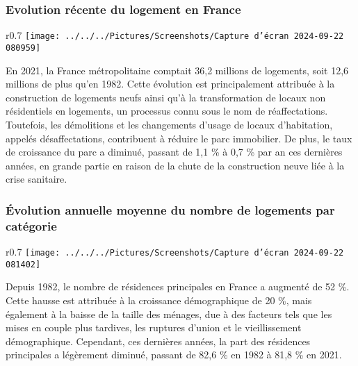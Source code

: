 \documentclass[a4paper, 12pt]{report}
\begin{document}
\subsubsection{Evolution récente du logement en France}

\begin{wrapfigure}{r}{0.7\textwidth}
	\centering
	\texttt{[image: ../../../Pictures/Screenshots/Capture d'écran 2024-09-22 080959]}
\end{wrapfigure}

En 2021, la France métropolitaine comptait 36,2 millions de logements, soit 12,6 millions de plus qu’en 1982. Cette évolution est principalement attribuée à la construction de logements neufs ainsi qu’à la transformation de locaux non résidentiels en logements, un processus connu sous le nom de réaffectations. Toutefois, les démolitions et les changements d’usage de locaux d’habitation, appelés désaffectations, contribuent à réduire le parc immobilier. De plus, le taux de croissance du parc a diminué, passant de 1,1 \% à 0,7 \% par an ces dernières années, en grande partie en raison de la chute de la construction neuve liée à la crise sanitaire.

\subsubsection{Évolution annuelle moyenne du nombre de logements par catégorie}

\begin{wrapfigure}{r}{0.7\textwidth}
	\centering
\texttt{[image: ../../../Pictures/Screenshots/Capture d'écran 2024-09-22 081402]}
\end{wrapfigure}

Depuis 1982, le nombre de résidences principales en France a augmenté de 52 \%. Cette hausse est attribuée à la croissance démographique de 20 \%, mais également à la baisse de la taille des ménages, due à des facteurs tels que les mises en couple plus tardives, les ruptures d’union et le vieillissement démographique. Cependant, ces dernières années, la part des résidences principales a légèrement diminué, passant de 82,6 \% en 1982 à 81,8 \% en 2021. 
\end{document}
